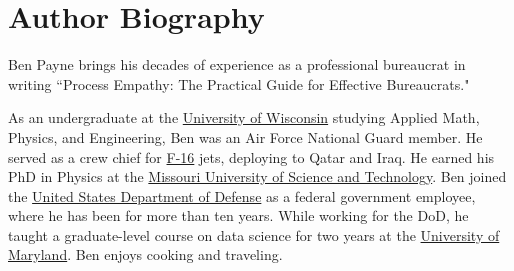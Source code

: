 \section*{Author Biography}

Ben Payne brings his decades of experience as a professional bureaucrat in writing ``Process Empathy: The Practical Guide for Effective Bureaucrats."

As an undergraduate at the 
\href{https://en.wikipedia.org/wiki/University_of_Wisconsin\%E2\%80\%93Madison}{University of Wisconsin} studying 
Applied Math, Physics, and Engineering, 
Ben was an Air Force National Guard member. He served as a crew chief for 
\href{https://en.wikipedia.org/wiki/General_Dynamics_F-16_Fighting_Falcon}{F-16} jets, deploying to Qatar and Iraq.
He earned his PhD in Physics at the 
\href{https://en.wikipedia.org/wiki/Missouri_University_of_Science_and_Technology}{Missouri University of Science and Technology}. Ben joined the 
\href{https://en.wikipedia.org/wiki/United_States_Department_of_Defense}{United States Department of Defense} as a federal government employee, where he has been for more than ten years. While working for the DoD, he taught a graduate-level course on data science for two years at the 
\href{https://en.wikipedia.org/wiki/University_of_Maryland,_Baltimore_County}{University of Maryland}. Ben enjoys cooking and traveling. 

